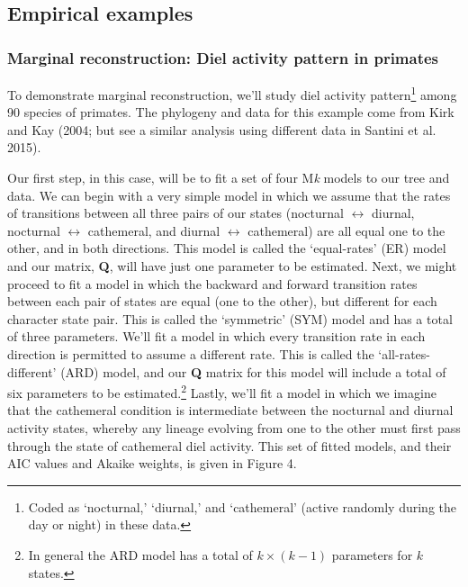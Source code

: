 \documentclass{article}
\begin{document}
\subsection{Empirical examples}\label{empirical-examples}

\subsubsection{Marginal reconstruction: Diel activity pattern in primates}\label{marginal-reconstruction-diel-activity-pattern-in-primates}

To demonstrate marginal reconstruction, we'll study diel activity pattern\footnote{Coded as `nocturnal,' `diurnal,' and `cathemeral' (active randomly during the day or night) in these data.} among 90 species of primates. The phylogeny and data for this example come from Kirk and Kay (2004; but see a similar analysis using different data in Santini et al. 2015).

Our first step, in this case, will be to fit a set of four M\emph{k} models to our tree and data. We can begin with a very simple model in which we assume that the rates of transitions between all three pairs of our states (nocturnal \(\leftrightarrow\) diurnal, nocturnal \(\leftrightarrow\) cathemeral, and diurnal \(\leftrightarrow\) cathemeral) are all equal one to the other, and in both directions. This model is called the `equal-rates' (ER) model and our matrix, \textbf{Q}, will have just one parameter to be estimated. Next, we might proceed to fit a model in which the backward and forward transition rates between each pair of states are equal (one to the other), but different for each character state pair. This is called the `symmetric' (SYM) model and has a total of three parameters. We'll fit a model in which every transition rate in each direction is permitted to assume a different rate. This is called the `all-rates-different' (ARD) model, and our \textbf{Q} matrix for this model will include a total of six parameters to be estimated.\footnote{In general the ARD model has a total of $k \times (k-1)$ parameters for $k$ states.} Lastly, we'll fit a model in which we imagine that the cathemeral condition is intermediate between the nocturnal and diurnal activity states, whereby any lineage evolving from one to the other must first pass through the state of cathemeral diel activity. This set of fitted models, and their AIC values and Akaike weights, is given in Figure 4.
\end{document}
